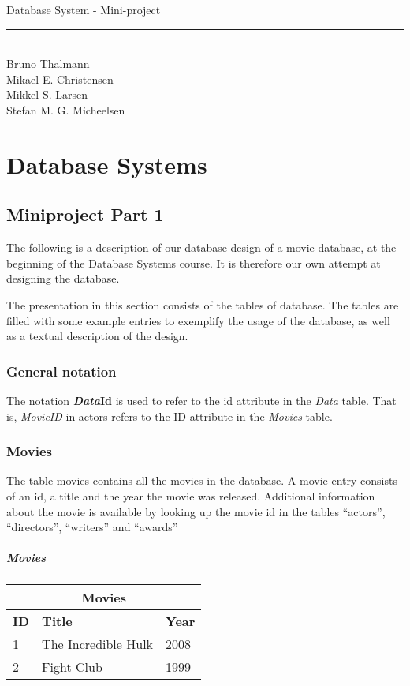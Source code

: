 
\newcommand{\HRule}{\rule{\linewidth}{0.5mm}}


\begin{titlepage}
\centering
{\LARGE Database System - Mini-project}
\HRule \\[0.5cm]
Bruno Thalmann\\
			Mikael E. Christensen\\
			Mikkel S. Larsen\\
			Stefan M. G. Micheelsen
\end{titlepage}

\chapter*{Database Systems}

\section{Miniproject Part 1}
The following is a description of our database design of a movie database, at the beginning of the Database Systems course.
It is therefore our own attempt at designing the database.

The presentation in this section consists of the tables of database.
The tables are filled with some example entries to exemplify the usage of the database, as well as a textual description of the design.

\subsection{General notation}
The notation \textbf{\textit{Data}Id} is used to refer to the id attribute in the \textit{Data} table.
That is, \textit{MovieID} in actors refers to the ID attribute in the \textit{Movies} table.

\subsection{Movies}
The table movies contains all the movies in the database. 
A movie entry consists of an id, a title and the year the movie was released.
Additional information about the movie is available by looking up the movie id in the tables ``actors'', ``directors'', ``writers'' and ``awards''

\paragraph{Movies}
\begin{center}
\begin{tabular}{|l|l|l|}
\hline
\multicolumn{3}{|c|}{Movies} \\ \hline \hline
\textbf{ID} & \textbf{Title} & \textbf{Year} \\ \hline \hline
1 & The Incredible Hulk & 2008 \\ \hline
2 & Fight Club & 1999 \\ \hline
\end{tabular}
\end{center}

